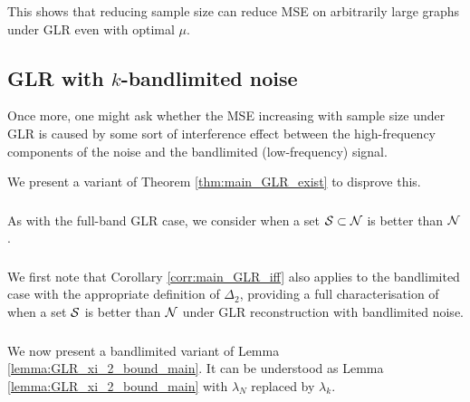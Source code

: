 {{\color{black} This shows that reducing sample size can reduce MSE on arbitrarily large graphs under GLR even with optimal $\mu$. 
}

\subsection{GLR with $k$-bandlimited noise}
\label{sec:GLR_bandlimited}
Once more, one might ask whether the MSE increasing with sample size under GLR is caused by some sort of interference effect between the high-frequency components of the noise and the bandlimited (low-frequency) signal. {\color{black} We present a variant of Theorem \ref{thm:main_GLR_exist} to disprove this.

\subsubsection{} As with the full-band GLR case, we consider when a set $\mathcal{S} \subset \mathcal{N}$ is better than $\mathcal{N}$.
\subsubsection{}
We first note that Corollary \ref{corr:main_GLR_iff} also applies to the bandlimited case with the appropriate definition of $\Delta_{2}$, providing a full characterisation of when a set $\mathcal{S}$ is better than $\mathcal{N}$ under GLR reconstruction with bandlimited noise.

\subsubsection{}
 We now present a bandlimited variant of Lemma \ref{lemma:GLR_xi_2_bound_main}. It can be understood as Lemma \ref{lemma:GLR_xi_2_bound_main} with $\lambda_{N}$ replaced by $\lambda_{k}$.

}}
